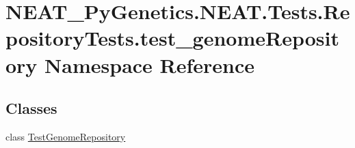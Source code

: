 \hypertarget{namespaceNEAT__PyGenetics_1_1NEAT_1_1Tests_1_1RepositoryTests_1_1test__genomeRepository}{}\section{N\+E\+A\+T\+\_\+\+Py\+Genetics.\+N\+E\+A\+T.\+Tests.\+Repository\+Tests.\+test\+\_\+genome\+Repository Namespace Reference}
\label{namespaceNEAT__PyGenetics_1_1NEAT_1_1Tests_1_1RepositoryTests_1_1test__genomeRepository}
\subsection*{Classes}
\begin{DoxyCompactItemize}
\item 
class \hyperlink{classNEAT__PyGenetics_1_1NEAT_1_1Tests_1_1RepositoryTests_1_1test__genomeRepository_1_1TestGenomeRepository}{Test\+Genome\+Repository}
\end{DoxyCompactItemize}
